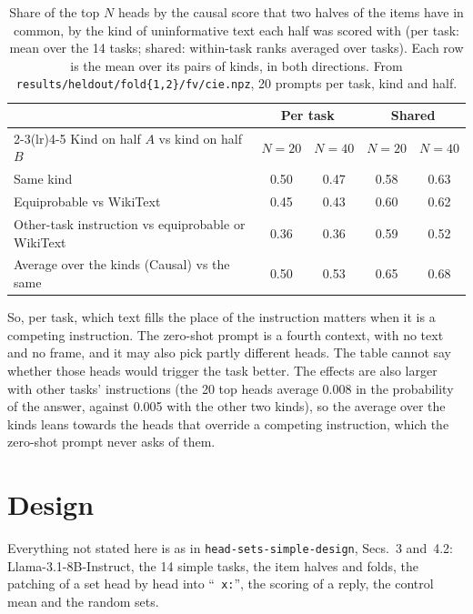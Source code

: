 \documentclass[10pt,a4paper]{article}
\newcommand{\p}[1]{``\texttt{#1}''}
\newcommand{\simpledoc}{\texttt{head-sets-simple-design}}
\begin{document}
\begin{table}[H]
\centering\small
\begin{tabular}{@{}lcccc@{}}
\toprule
 & \multicolumn{2}{c}{Per task} & \multicolumn{2}{c}{Shared} \\
\cmidrule(lr){2-3}\cmidrule(lr){4-5}
Kind on half $A$ vs kind on half $B$ & $N=20$ & $N=40$ & $N=20$ & $N=40$ \\
\midrule
Same kind & 0.50 & 0.47 & 0.58 & 0.63 \\
Equiprobable vs WikiText & 0.45 & 0.43 & 0.60 & 0.62 \\
Other-task instruction vs equiprobable or WikiText & 0.36 & 0.36 & 0.59 & 0.52 \\
Average over the kinds (Causal) vs the same & 0.50 & 0.53 & 0.65 & 0.68 \\
\bottomrule
\end{tabular}
\caption{Share of the top $N$ heads by the causal score that two halves of the items have in common, by the kind of uninformative text each half was scored with (per task: mean over the 14 tasks; shared: within-task ranks averaged over tasks). Each row is the mean over its pairs of kinds, in both directions. From \texttt{results/heldout/fold\{1,2\}/fv/cie.npz}, 20 prompts per task, kind and half.}
\label{tab:kinds}
\end{table}

So, per task, which text fills the place of the instruction matters when it is a competing instruction. The zero-shot prompt is a fourth context, with no text and no frame, and it may also pick partly different heads. The table cannot say whether those heads would trigger the task better. The effects are also larger with other tasks' instructions (the 20 top heads average 0.008 in the probability of the answer, against 0.005 with the other two kinds), so the average over the kinds leans towards the heads that override a competing instruction, which the zero-shot prompt never asks of them.

\section{Design}\label{sec:design}

Everything not stated here is as in \simpledoc{}, Secs.~3 and~4.2: Llama-3.1-8B-Instruct, the 14 simple tasks, the item halves and folds, the patching of a set head by head into \p{ x:}, the scoring of a reply, the control mean and the random sets.
\end{document}
